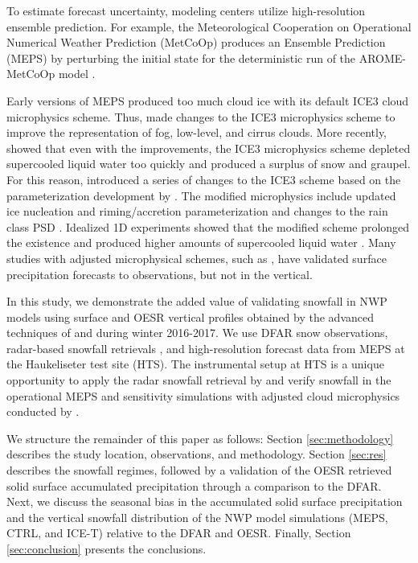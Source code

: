 \documentclass{ametsocV5}
\begin{document}
    To estimate forecast uncertainty, modeling centers utilize high-resolution ensemble prediction. For example, the Meteorological Cooperation on Operational Numerical Weather Prediction (MetCoOp) produces an Ensemble Prediction (MEPS) by perturbing the initial state for the deterministic run of the  AROME-MetCoOp model \citep[AROME-Applications of Research to Operations at Mesoscale;][]{frogner_convection-permitting_2019}. 
    
    Early versions of MEPS produced too much cloud ice with its default ICE3 cloud microphysics scheme. Thus, \citet{muller_arome-metcoop:_2017} made changes to the ICE3 microphysics scheme to improve the representation of fog, low-level, and cirrus clouds. More recently, \citet{engdahl_improving_2020} showed that even with the improvements, the ICE3 microphysics scheme depleted supercooled liquid water too quickly and produced a surplus of snow and graupel. For this reason, \citet{engdahl_improving_2020} introduced a series of changes to the ICE3 scheme based on the parameterization development by \citet{thompson_explicit_2004,thompson_explicit_2008}. The modified microphysics include updated ice nucleation and riming/accretion parameterization and changes to the rain class PSD \citep{engdahl_improving_2020}. Idealized 1D experiments showed that the modified scheme prolonged the existence and produced higher amounts of supercooled liquid water \citep{engdahl_improving_2020}. 
	Many studies with adjusted microphysical schemes, such as \cite{liu_high-resolution_2011}, have validated surface precipitation forecasts to observations, but not in the vertical.
    

    
    In this study, we demonstrate the added value of validating snowfall in NWP models using surface and OESR vertical profiles obtained by the advanced techniques of \citet{cooper_variational_2017} and \citet{schirle_estimation_2019} during winter 2016-2017. We use DFAR snow observations, radar-based snowfall retrievals \citep{cooper_variational_2017,schirle_estimation_2019}, and high-resolution forecast data from MEPS at the Haukeliseter test site (HTS). The instrumental setup at HTS is a unique opportunity to apply the radar snowfall retrieval by \citet{schirle_estimation_2019} and verify snowfall in the operational MEPS and sensitivity simulations with adjusted cloud microphysics conducted by \citet{engdahl_effects_2020}.
    
    We structure the remainder of this paper as follows: Section \ref{sec:methodology} describes the study location, observations, and methodology. Section \ref{sec:res} describes the snowfall regimes, followed by a validation of the OESR retrieved solid surface accumulated precipitation through a comparison to the DFAR. Next, we discuss the seasonal bias in the accumulated solid surface precipitation and the vertical snowfall distribution of the NWP model simulations (MEPS, CTRL, and ICE-T) relative to the DFAR and OESR. Finally, Section \ref{sec:conclusion} presents the conclusions.
\end{document}
